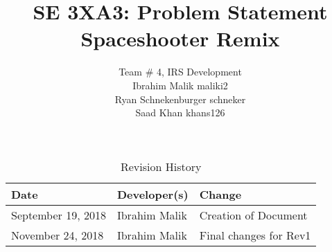 \documentclass{article}
\begin{document}
\title{SE 3XA3: Problem Statement\\Spaceshooter Remix}

\author{Team \# 4, IRS Development 
		\\ Ibrahim Malik maliki2
		\\ Ryan Schnekenburger  schneker
		\\ Saad Khan khans126
}

\date{}

\maketitle

\newpage

\begin{table}[h]
\caption{Revision History} \label{TblRevisionHistory}
\begin{tabularx}{\textwidth}{llX}
\toprule
\textbf{Date} & \textbf{Developer(s)} & \textbf{Change}\\
\midrule
September 19, 2018 & Ibrahim Malik & Creation of Document\\
November 24, 2018 & Ibrahim Malik & Final changes for Rev1\\
\bottomrule
\end{tabularx}
\end{table}

\newpage
\end{document}
